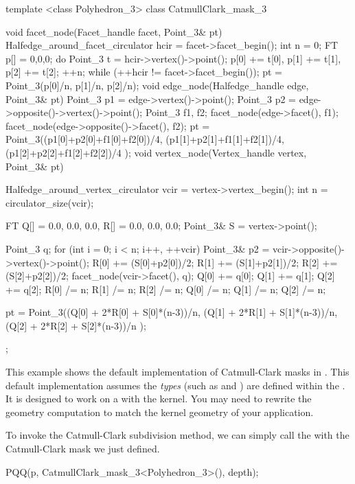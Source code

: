 \begin{ccExampleCode}
template <class Polyhedron_3>
class CatmullClark_mask_3 {
  void facet_node(Facet_handle facet, Point_3& pt) {
    Halfedge_around_facet_circulator hcir = facet->facet_begin();
    int n = 0;
    FT p[] = {0,0,0};
    do {
      Point_3 t = hcir->vertex()->point();
      p[0] += t[0], p[1] += t[1], p[2] += t[2]; 
      ++n;
    } while (++hcir != facet->facet_begin());
    pt = Point_3(p[0]/n, p[1]/n, p[2]/n);
  }
  void edge_node(Halfedge_handle edge, Point_3& pt) {
    Point_3 p1 = edge->vertex()->point();
    Point_3 p2 = edge->opposite()->vertex()->point();
    Point_3 f1, f2;
    facet_node(edge->facet(), f1);
    facet_node(edge->opposite()->facet(), f2);
    pt = Point_3((p1[0]+p2[0]+f1[0]+f2[0])/4,
                 (p1[1]+p2[1]+f1[1]+f2[1])/4,
                 (p1[2]+p2[2]+f1[2]+f2[2])/4 );
  }
  void vertex_node(Vertex_handle vertex, Point_3& pt) {
    Halfedge_around_vertex_circulator vcir = vertex->vertex_begin();
    int n = circulator_size(vcir);    

    FT Q[] = {0.0, 0.0, 0.0}, R[] = {0.0, 0.0, 0.0};
    Point_3& S = vertex->point();
    
    Point_3 q;
    for (int i = 0; i < n; i++, ++vcir) {
      Point_3& p2 = vcir->opposite()->vertex()->point();
      R[0] += (S[0]+p2[0])/2;
      R[1] += (S[1]+p2[1])/2;
      R[2] += (S[2]+p2[2])/2;
      facet_node(vcir->facet(), q);
      Q[0] += q[0];      
      Q[1] += q[1];      
      Q[2] += q[2];
    }
    R[0] /= n;    R[1] /= n;    R[2] /= n;
    Q[0] /= n;    Q[1] /= n;    Q[2] /= n;
      
    pt = Point_3((Q[0] + 2*R[0] + S[0]*(n-3))/n,
                 (Q[1] + 2*R[1] + S[1]*(n-3))/n,
                 (Q[2] + 2*R[2] + S[2]*(n-3))/n );
  }
};
\end{ccExampleCode}

This example shows the default implementation of Catmull-Clark 
masks in .
This default implementation assumes the \emph{types} 
(such as  and ) are defined 
within the . It is designed
to work on a  with the  
kernel. You may need to rewrite the geometry computation
to match the kernel geometry of your application.

To invoke the Catmull-Clark subdivision method, we can 
simply call the  with the Catmull-Clark mask
we just defined.

\begin{ccExampleCode}
PQQ(p, CatmullClark_mask_3<Polyhedron_3>(), depth);
\end{ccExampleCode}

